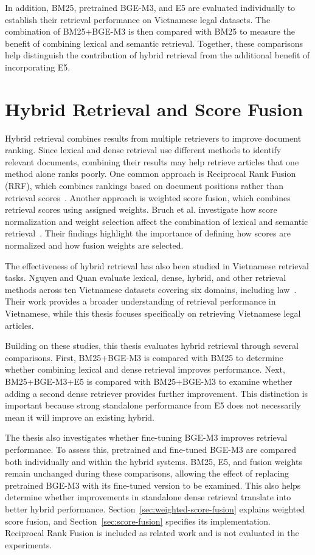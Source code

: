 In addition, BM25, pretrained BGE-M3, and E5 are evaluated individually to establish their retrieval performance on Vietnamese legal datasets. The combination of BM25+BGE-M3 is then compared with BM25 to measure the benefit of combining lexical and semantic retrieval. Together, these comparisons help distinguish the contribution of hybrid retrieval from the additional benefit of incorporating E5.

\section{Hybrid Retrieval and Score Fusion}
Hybrid retrieval combines results from multiple retrievers to improve document ranking. Since lexical and dense retrieval use different methods to identify relevant documents, combining their results may help retrieve articles that one method alone ranks poorly. One common approach is Reciprocal Rank Fusion (RRF), which combines rankings based on document positions rather than retrieval scores~\cite{cormack2009}. Another approach is weighted score fusion, which combines retrieval scores using assigned weights. Bruch et al. investigate how score normalization and weight selection affect the combination of lexical and semantic retrieval~\cite{bruch2022}. Their findings highlight the importance of defining how scores are normalized and how fusion weights are selected.

The effectiveness of hybrid retrieval has also been studied in Vietnamese retrieval tasks. Nguyen and Quan evaluate lexical, dense, hybrid, and other retrieval methods across ten Vietnamese datasets covering six domains, including law~\cite{nguyenquan2026}. Their work provides a broader understanding of retrieval performance in Vietnamese, while this thesis focuses specifically on retrieving Vietnamese legal articles.

Building on these studies, this thesis evaluates hybrid retrieval through several comparisons. First, BM25+BGE-M3 is compared with BM25 to determine whether combining lexical and dense retrieval improves performance. Next, BM25+BGE-M3+E5 is compared with BM25+BGE-M3 to examine whether adding a second dense retriever provides further improvement. This distinction is important because strong standalone performance from E5 does not necessarily mean it will improve an existing hybrid.

The thesis also investigates whether fine-tuning BGE-M3 improves retrieval performance. To assess this, pretrained and fine-tuned BGE-M3 are compared both individually and within the hybrid systems. BM25, E5, and fusion weights remain unchanged during these comparisons, allowing the effect of replacing pretrained BGE-M3 with its fine-tuned version to be examined. This also helps determine whether improvements in standalone dense retrieval translate into better hybrid performance. Section~\ref{sec:weighted-score-fusion} explains weighted score fusion, and Section~\ref{sec:score-fusion} specifies its implementation. Reciprocal Rank Fusion is included as related work and is not evaluated in the experiments.

